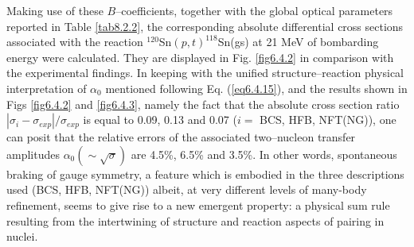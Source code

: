 Making use of these $B$--coefficients, together with the global optical parameters reported in Table \ref{tab8.2.2}, the corresponding absolute differential cross sections associated with the reaction $^{120}$Sn$(p,t)^{118}$Sn(gs) at 21 MeV of bombarding energy were calculated. They are displayed in Fig. \ref{fig6.4.2} in comparison with the experimental findings. In keeping with the unified structure--reaction physical interpretation of $\alpha_0$ mentioned following Eq. (\ref{eq6.4.15}), and 
the results shown in Figs \ref{fig6.4.2} and \ref{fig6.4.3}, namely the fact that the absolute cross section ratio $|\sigma_i-\sigma_{exp}|/\sigma_{exp}$ is equal to 0.09, 0.13 and 0.07 ($i=$ BCS, HFB, NFT(NG)), one can posit that the relative errors of the associated two--nucleon transfer amplitudes $\alpha_0(\sim\sqrt{\sigma})$ are 4.5\%, 6.5\% and 3.5\%. In other words, spontaneous braking of gauge symmetry, a feature which is embodied in the three descriptions used (BCS, HFB, NFT(NG)) albeit, at very different levels of many-body refinement, seems to give rise to a new emergent property: a physical sum rule resulting from the intertwining of structure and reaction aspects of pairing in nuclei. 

